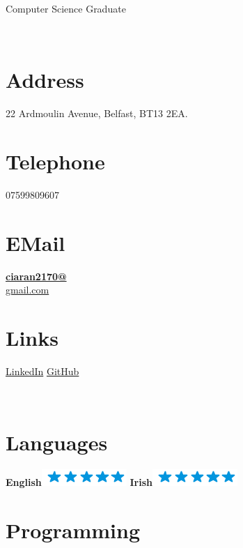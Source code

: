 \documentclass[]{friggeri-cv}
\begin{document}
      {Computer Science Graduate}
      

\begin{aside}
  	~
  	~
  	~
  	~
  	~
  	~
  	~
  	~
  \section{Address}
    22 Ardmoulin Avenue,
    Belfast,
    BT13 2EA.
    ~
  \section{Telephone}
    07599809607
    ~
  \section{EMail}
    \href{mailto:ciaran2170@gmail.com}{\textbf{ciaran2170@}\\gmail.com}
    ~
  \section{Links}
    \href{https://www.linkedin.com/in/ciaranadams/}{LinkedIn}
    \href{https://github.com/Ciaran48/}{GitHub}
    
    
    ~
  \section{Languages}
    \textbf{English}\includegraphics[scale=0.40]{img/5stars.png}
    \textbf{Irish}\includegraphics[scale=0.40]{img/5stars.png}
    ~
    ~
  \section{Programming}
    ~
    ~

\end{aside}
\end{document}
